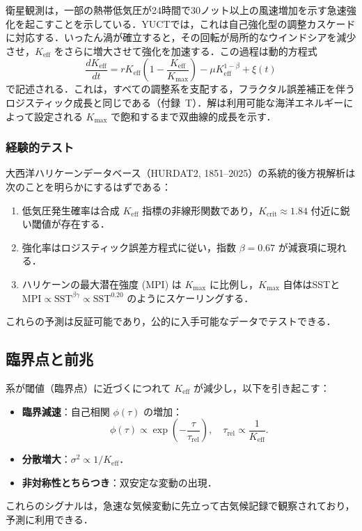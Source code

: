 \documentclass[11pt,a4paper]{article}
\newcommand{\Keff}{K_{\mathrm{eff}}}
\begin{document}
	衛星観測は，一部の熱帯低気圧が24時間で30ノット以上の風速増加を示す急速強化を起こすことを示している．YUCTでは，これは自己強化型の調整カスケードに対応する．いったん渦が確立すると，その回転が局所的なウインドシアを減少させ，$\Keff$ をさらに増大させて強化を加速する．この過程は動的方程式
	\[
	\frac{d\Keff}{dt} = r \Keff \left( 1 - \frac{\Keff}{K_{\max}} \right)
	- \mu \Keff^{1-\beta} + \xi(t)
	\]
	で記述される．これは，すべての調整系を支配する，フラクタル誤差補正を伴うロジスティック成長と同じである（付録~T）．解は利用可能な海洋エネルギーによって設定される $K_{\max}$ で飽和するまで双曲線的成長を示す．
	
	\subsubsection*{経験的テスト}
	
	大西洋ハリケーンデータベース（HURDAT2, 1851--2025）の系統的後方視解析は次のことを明らかにするはずである：
	\begin{enumerate}
		\item 低気圧発生確率は合成 $\Keff$ 指標の非線形関数であり，$K_{\mathrm{crit}} \approx 1.84$ 付近に鋭い閾値が存在する．
		\item 強化率はロジスティック誤差方程式に従い，指数 $\beta = 0.67$ が減衰項に現れる．
		\item ハリケーンの最大潜在強度 (MPI) は $K_{\max}$ に比例し，$K_{\max}$ 自体はSSTと $\mathrm{MPI} \propto \mathrm{SST}^{\beta\gamma} \propto \mathrm{SST}^{0.20}$ のようにスケーリングする．
	\end{enumerate}
	これらの予測は反証可能であり，公的に入手可能なデータでテストできる．
	
	\subsection{臨界点と前兆}
	
	系が閾値（臨界点）に近づくにつれて $\Keff$ が減少し，以下を引き起こす：
	\begin{itemize}
		\item \textbf{臨界減速}：自己相関 $\phi(\tau)$ の増加：
		\[
		\phi(\tau) \propto \exp\!\left(-\frac{\tau}{\tau_{\text{rel}}}\right),\quad \tau_{\text{rel}} \propto \frac{1}{\Keff}.
		\]
		\item \textbf{分散増大}：$\sigma^2 \propto 1/\Keff$．
		\item \textbf{非対称性とちらつき}：双安定な変動の出現．
	\end{itemize}
	これらのシグナルは，急速な気候変動に先立って古気候記録で観察されており，予測に利用できる．
	
\end{document}
